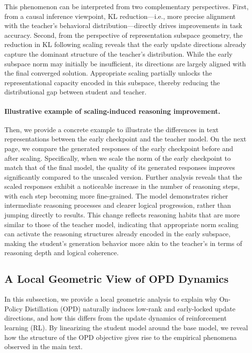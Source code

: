 \documentclass{article}
\begin{document}
This phenomenon can be interpreted from two complementary perspectives. First, from a causal inference viewpoint, KL reduction—i.e., more precise alignment with the teacher’s behavioral distribution—directly drives improvements in task accuracy. Second, from the perspective of representation subspace geometry, the reduction in KL following scaling reveals that the early update directions already capture the dominant structure of the teacher’s distribution. While the early subspace norm may initially be insufficient, its directions are largely aligned with the final converged solution. Appropriate scaling partially unlocks the representational capacity encoded in this subspace, thereby reducing the distributional gap between student and teacher.


\paragraph{Illustrative example of scaling-induced reasoning improvement.}
Then, we provide a concrete example to illustrate the differences in text representations between the early checkpoint and the teacher model. On the next page, we compare the generated responses of the early checkpoint before and after scaling. Specifically, when we scale the norm of the early checkpoint to match that of the final model, the quality of its generated responses improves significantly compared to the unscaled version. Further analysis reveals that the scaled responses exhibit a noticeable increase in the number of reasoning steps, with each step becoming more fine-grained. The model demonstrates richer intermediate reasoning processes and clearer logical progression, rather than jumping directly to results. This change reflects reasoning habits that are more similar to those of the teacher model, indicating that appropriate norm scaling can activate the reasoning structures already encoded in the early subspace, making the student's generation behavior more akin to the teacher's in terms of reasoning depth and logical coherence.


\subsection{A Local Geometric View of OPD Dynamics}
\label{A Linearized View of OPD Dynamics}

In this subsection, we provide a local geometric analysis to explain why On-Policy Distillation (OPD) naturally induces low-rank and early-locked update directions, and how this differs from the update dynamics of reinforcement learning (RL). By linearizing the student model around the base model, we reveal how the structure of the OPD objective gives rise to the empirical phenomena observed in the main text.
\end{document}
